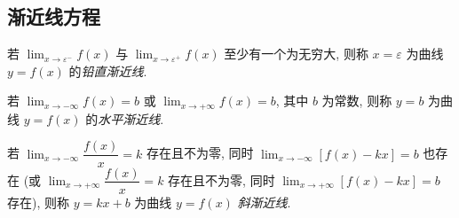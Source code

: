 \subsection{渐近线方程}

\begin{definition}[铅直渐近线]
    若 $\displaystyle\lim_{x\to\varepsilon^-}f(x)$ 与 $\displaystyle \lim_{x\to\varepsilon^+}f(x)$ 至少有一个为无穷大, 则称 $x=\varepsilon$ 为曲线 $y=f(x)$ 的\textit{铅直渐近线}.
\end{definition}
\begin{definition}[水平渐近线]
    若 $\displaystyle\lim_{x\to-\infty}f(x)=b$ 或 $\displaystyle\lim_{x\to+\infty}f(x)=b$, 其中 $b$ 为常数, 则称 $y=b$ 为曲线 $y=f(x)$ 的\textit{水平渐近线}.
\end{definition}
\begin{definition}[斜渐近线]
    若 $\displaystyle\lim_{x\to-\infty}\dfrac{f(x)}{x}=k$ 存在且不为零, 同时 $\displaystyle\lim_{x\to-\infty}[f(x)-kx]=b$ 也存在 (或 $\displaystyle\lim_{x\to+\infty}\dfrac{f(x)}{x}=k$ 存在且不为零, 同时 $\displaystyle\lim_{x\to+\infty}[f(x)-kx]=b$ 存在), 
    则称 $y=kx+b$ 为曲线 $y=f(x)$ \textit{斜渐近线}.
\end{definition}

